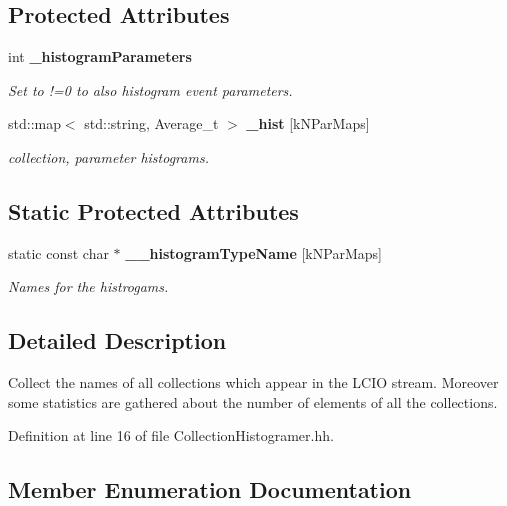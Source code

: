 \subsection*{Protected Attributes}
\begin{DoxyCompactItemize}
\item 
int {\bf \_\-histogramParameters}
\begin{DoxyCompactList}\small\item\em Set to !=0 to also histogram event parameters. \item\end{DoxyCompactList}\item 
std::map$<$ std::string, Average\_\-t $>$ {\bf \_\-hist} [kNParMaps]
\begin{DoxyCompactList}\small\item\em collection, parameter histograms. \item\end{DoxyCompactList}\end{DoxyCompactItemize}
\subsection*{Static Protected Attributes}
\begin{DoxyCompactItemize}
\item 
static const char $\ast$ {\bf \_\-\_\-histogramTypeName} [kNParMaps]
\begin{DoxyCompactList}\small\item\em Names for the histrogams. \item\end{DoxyCompactList}\end{DoxyCompactItemize}


\subsection{Detailed Description}
Collect the names of all collections which appear in the LCIO stream. Moreover some statistics are gathered about the number of elements of all the collections. 

Definition at line 16 of file CollectionHistogramer.hh.

\subsection{Member Enumeration Documentation}
